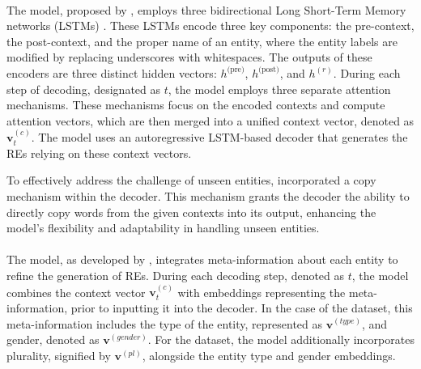 \paragraph*{} 

The  model, proposed by \citet{cunha-etal-2020-referring}, employs three bidirectional Long Short-Term Memory networks (LSTMs) \citep{hochreiter1997long}. These LSTMs encode three key components: the pre-context, the post-context, and the proper name of an entity, where the entity labels are modified by replacing underscores with whitespaces. The outputs of these encoders are three distinct hidden vectors: $h^{\text{(pre)}}$, $h^{\text{(post)}}$, and $h^{(r)}$. During each step of decoding, designated as $t$, the model employs three separate attention mechanisms. These mechanisms focus on the encoded contexts and compute attention vectors, which are then merged into a unified context vector, denoted as $\mathbf{v}^{(c)}_t$. The model uses an autoregressive LSTM-based decoder that generates the REs relying on these context vectors. 

To effectively address the challenge of unseen entities, \citet{cunha-etal-2020-referring} incorporated a copy mechanism within the decoder. This mechanism grants the decoder the ability to directly copy words from the given contexts into its output, enhancing the model's flexibility and adaptability in handling unseen entities.


\paragraph*{} 

The  model, as developed by \citet{cunha-etal-2020-referring}, integrates meta-information about each entity to refine the generation of REs. During each decoding step, denoted as $t$, the model combines the context vector $\mathbf{v}^{(c)}_t$ with embeddings representing the meta-information, prior to inputting it into the decoder. In the case of the \webnlg dataset, this meta-information includes the type of the entity, represented as $\textbf{v}^{(type)}$, and gender, denoted as $\textbf{v}^{(gender)}$. For the \wsj dataset, the model additionally incorporates plurality, signified by $\textbf{v}^{(pl)}$, alongside the entity type and gender embeddings.

\paragraph*{}

